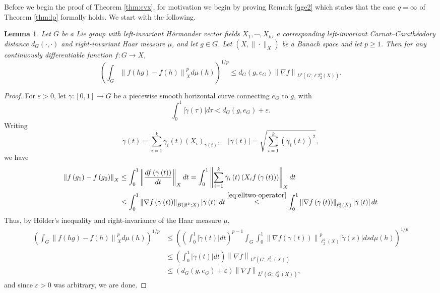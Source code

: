 \documentclass[11pt,reqno]{amsart}
\newtheorem{lemma}[theorem]{Lemma}
\newcommand{\1}{\mathbf 1}
\begin{document}
Before we begin the proof of Theorem \ref{thm:cvx}, for motivation we begin by proving Remark \ref{qge2} which states that the case $q=\infty$ of Theorem \ref{thm:lp} formally holds. We start with the following.
\begin{lemma}\label{lem:deterministic-path}
    Let $G$ be a Lie group with left-invariant H\"ormander vector fields $X_1,\cdots,X_k$, a corresponding left-invariant Carnot--Carath\'eodory distance $d_G\left(\cdot,\cdot\right)$ and right-invariant Haar measure $\mu$, and let $g\in G$. Let $\left(X,\|\cdot\|_X\right)$ be a Banach space and let $p\ge 1$. Then for any continuously differentiable function $f:G\to X$,
    \begin{equation}\label{eq:deterministic-path}
        \left(\int_{G}\left\|f\left(hg\right)-f\left(h\right)\right\|_X^pd\mu\left(h\right)\right)^{1/p}
\le d_G\left(g,e_G\right)  \left\|\nabla f\right\|_{L^p\left(G;\ell2_2^k(X)\right)}.
    \end{equation}
\end{lemma}
\begin{proof}\label{proofrmkqge2}
For $\varepsilon> 0$, let $\gamma:\left[0,1\right]\to G$ be a piecewise smooth horizontal curve connecting $e_G$ to $g$, with
\[
\int_0^1\left|\dot\gamma\left(\tau\right)\right|d\tau<d_G\left(g,e_G\right)+\varepsilon.
\]
Writing
\[
\dot{\gamma}\left(t\right)=\sum_{i=1}^k \dot{\gamma}_i(t)\left(X_i\right)_{\gamma\left(t\right)},\quad \left|\dot\gamma\left(t\right)\right|=\sqrt{\sum_{i=1}^k \left(\dot \gamma_i\left(t\right)\right)^2},
\]
we have
\begin{align*}
	\left\|f\left(g_1\right)-f\left(g_0\right)\right\|_X&\le \int_0^1 \left\|\frac{df\left(\gamma\left(t\right)\right)}{dt}\right\|_Xdt=\int_0^1 \left\|\sum_{i=1}^k \dot\gamma_i\left(t\right)\left(X_if\left(\gamma\left(t\right)\right)\right)\right\|_Xdt\\
	&\le \int_0^1 \left\|\nabla f\left(\gamma\left(t\right)\right)\right\|_{B\left(\mathbb{R}^k; X\right)}\left|\dot\gamma\left(t\right)\right|dt\stackrel{\eqref{eq:elltwo-operator}}{\le} \int_0^1 \left\|\nabla f\left(\gamma\left(t\right)\right)\right\|_{\ell_2^k(X)}\left|\dot\gamma\left(t\right)\right|dt
\end{align*}
Thus, by H\"older's inequality and right-invariance of the Haar measure $\mu$,
\begin{align*}
\left(\int_{G}\left\|f\left(hg\right)-f\left(h\right)\right\|_X^pd\mu\left(h\right)\right)^{1/p}&\le \left( \left(\int_0^1\left|\dot\gamma\left(t\right)\right|dt\right)^{p-1}\int_G  \int_0^{1}\left\|\nabla f\left(\gamma\left(t\right)\right)\right\|_{\ell_2^k(X)}^p\left|\dot\gamma\left(s\right)\right|dsd\mu\left(h\right)\right)^{1/p}\\
&\le\left(\int_0^1\left|\dot\gamma\left(t\right)\right|dt\right)\left\|\nabla f\right\|_{L^p\left(G;\ell_2^k(X)\right)}\\
&\le\left(d_G\left(g,e_G\right)+\varepsilon\right)\left\|\nabla f\right\|_{L^p\left(G;\ell_2^k(X)\right)},
\end{align*}
and since $\varepsilon> 0$ was arbitrary, we are done.
\end{proof}
\end{document}
